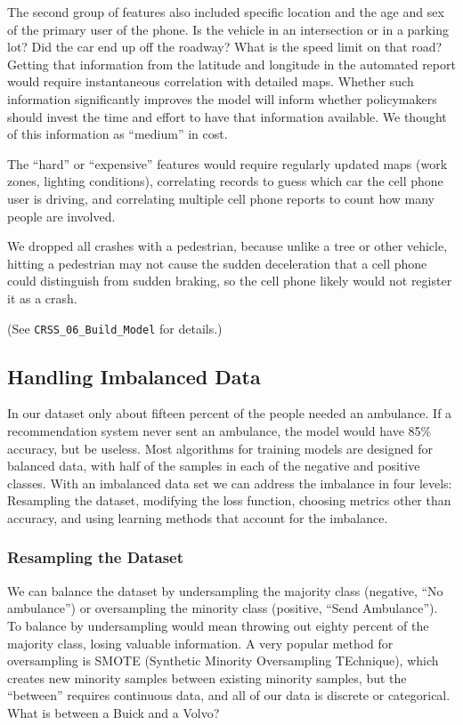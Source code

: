 The second group of features also included specific location and the age and sex of the primary user of the phone.  Is the vehicle in an intersection or in a parking lot?  Did the car end up off the roadway?  What is the speed limit on that road?  Getting that information from the latitude and longitude in the automated report would require instantaneous correlation with detailed maps.  Whether such information significantly improves the model will inform whether policymakers should invest the time and effort to have that information available.  We thought of this information as ``medium'' in cost.

The ``hard'' or ``expensive'' features would require regularly updated maps (work zones, lighting conditions), correlating records to guess which car the cell phone user is driving, and correlating multiple cell phone reports to count how many people are involved.  

We dropped all crashes with a pedestrian, because unlike a tree or other vehicle, hitting a pedestrian may not cause the sudden deceleration that a cell phone could distinguish from sudden braking, so the cell phone likely would not register it as a crash.  

(See \verb|CRSS_06_Build_Model| for details.)


\subsection{Handling Imbalanced Data}

In our dataset only about fifteen percent of the people needed an ambulance.   If a recommendation system never sent an ambulance, the model would have 85\% accuracy, but be useless.  Most algorithms for training models are designed for balanced data, with half of the samples in each of the negative and positive classes.  With an imbalanced data set we can address the imbalance in four levels:  Resampling the dataset, modifying the loss function, choosing metrics other than accuracy, and using learning methods that account for the imbalance.  

\subsubsection{Resampling the Dataset}

We can balance the dataset by undersampling the majority class (negative, ``No ambulance'') or oversampling the minority class (positive, ``Send Ambulance'').  To balance by undersampling would mean throwing out eighty percent of the majority class, losing valuable information.  A very popular method for oversampling is SMOTE (Synthetic Minority Oversampling TEchnique), which creates new minority samples between existing minority samples, but the ``between'' requires continuous data, and all of our data is discrete or categorical.  What is between a Buick and a Volvo?

